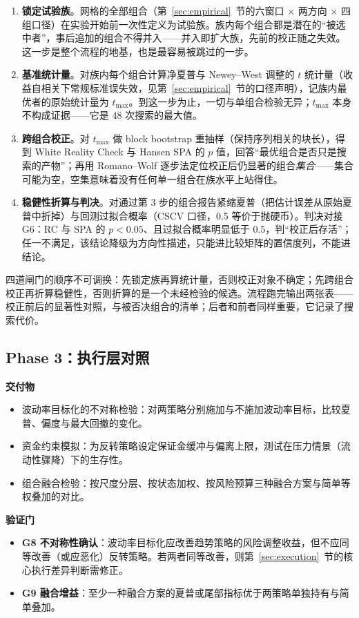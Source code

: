 \begin{enumerate}[leftmargin=2.2em]
  \item \textbf{锁定试验族}。网格的全部组合（第~\ref{sec:empirical}~节的六窗口 × 两方向 × 四组口径）在实验开始前一次性定义为试验族。族内每个组合都是潜在的“被选中者”，事后追加的组合不得并入——并入即扩大族，先前的校正随之失效。这一步是整个流程的地基，也是最容易被跳过的一步。
  \item \textbf{基准统计量}。对族内每个组合计算净夏普与 Newey--West 调整的 $t$ 统计量（收益自相关下常规标准误失效，见第~\ref{sec:empirical}~节的口径声明），记族内最优者的原始统计量为 $t_{\max}$。到这一步为止，一切与单组合检验无异；$t_{\max}$ 本身不构成证据——它是 48 次搜索的最大值。
  \item \textbf{跨组合校正}。对 $t_{\max}$ 做 block bootstrap 重抽样（保持序列相关的块长），得到 White Reality Check 与 Hansen SPA 的 $p$ 值，回答“最优组合是否只是搜索的产物”；再用 Romano--Wolf 逐步法定位校正后仍显著的组合\emph{集合}——集合可能为空，空集意味着没有任何单一组合在族水平上站得住。
  \item \textbf{稳健性折算与判决}。对通过第 3 步的组合报告紧缩夏普（把估计误差从原始夏普中折掉）与回测过拟合概率（CSCV 口径，0.5 等价于抛硬币）。判决对接 G6：RC 与 SPA 的 $p<0.05$、且过拟合概率明显低于 0.5，判“校正后存活”；任一不满足，该结论降级为方向性描述，只能进比较矩阵的置信度列，不能进结论。
\end{enumerate}

四道闸门的顺序不可调换：先锁定族再算统计量，否则校正对象不确定；先跨组合校正再折算稳健性，否则折算的是一个未经检验的候选。流程跑完输出两张表——校正前后的显著性对照，与被否决组合的清单；后者和前者同样重要，它记录了搜索代价。

\subsection{Phase 3：执行层对照}

\textbf{交付物}
\begin{itemize}[leftmargin=2.2em]
  \item 波动率目标化的不对称检验：对两策略分别施加与不施加波动率目标，比较夏普、偏度与最大回撤的变化。
  \item 资金约束模拟：为反转策略设定保证金缓冲与偏离上限，测试在压力情景（流动性骤降）下的生存性。
  \item 组合融合检验：按尺度分层、按状态加权、按风险预算三种融合方案与简单等权叠加的对比。
\end{itemize}

\textbf{验证门}
\begin{itemize}[leftmargin=2.2em]
  \item \textbf{G8 不对称性确认}：波动率目标化应改善趋势策略的风险调整收益，但不应同等改善（或应恶化）反转策略。若两者同等改善，则第~\ref{sec:execution}~节的核心执行差异判断需修正。
  \item \textbf{G9 融合增益}：至少一种融合方案的夏普或尾部指标优于两策略单独持有与简单叠加。
\end{itemize}

